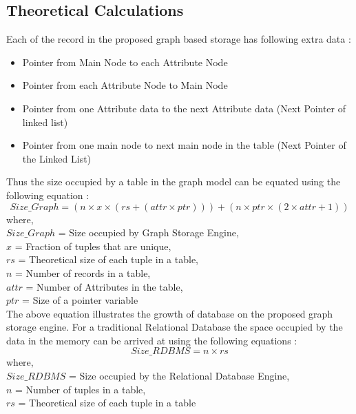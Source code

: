 \documentclass[12pt, oneside]{book}
\begin{document}
\subsection{Theoretical Calculations}
\label{sec:theory}
Each of the record in the proposed graph based storage has following extra data :
\begin{itemize}
 \item Pointer from Main Node to each Attribute Node
 \item Pointer from each Attribute Node to Main Node
 \item Pointer from one Attribute data to the next Attribute data (Next Pointer of linked list)
 \item Pointer from one main node to next main node in the table (Next Pointer of the Linked List)
\end{itemize}
Thus the size occupied by a table in the graph model can be equated using the following equation :
\begin{equation}
  Size\_Graph = (n \times x \times (rs + (attr \times ptr)) ) + (n \times ptr \times (2 \times attr + 1))
  \label{grsize}
\end{equation}
where, \\
$Size\_Graph$ = Size occupied by Graph Storage Engine, \\
$x$ = Fraction of tuples that are unique, \\
$rs$ = Theoretical size of each tuple in a table, \\
$n$ = Number of records in a table, \\
$attr$ = Number of Attributes in the table, \\
$ptr$ = Size of a pointer variable \\

The above equation illustrates the growth of database on the proposed graph storage engine. For a traditional Relational Database the space occupied by the data in the memory can be arrived at using the following equations :
\begin{equation}
 Size\_RDBMS = n \times rs
 \label{rdbmssize}
\end{equation}
where, \\
$Size\_RDBMS$ = Size occupied by the Relational Database Engine, \\
$n$ = Number of tuples in a table, \\
$rs$ = Theoretical size of each tuple in a table \\
\end{document}
